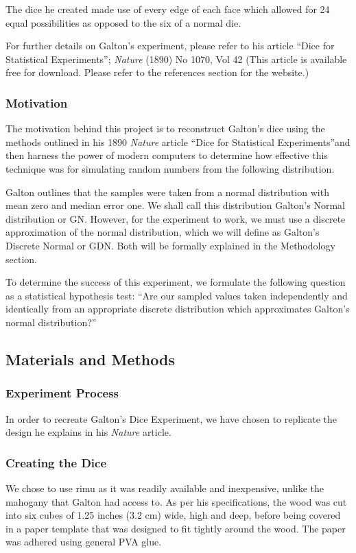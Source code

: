 The dice he created made use of every edge of each face which allowed for 24 equal possibilities as opposed to the six of a normal die.

For further details on Galton's experiment, please refer to his article \textquotedblleft Dice for Statistical Experiments\textquotedblright; \textit{Nature} (1890) No 1070, Vol 42 (This article is available free for download. Please refer to the references section for the website.)

\subsubsection*{Motivation}
The motivation behind this project is to reconstruct Galton's dice using the methods outlined in his 1890 \textit{Nature} article \textquotedblleft Dice for Statistical Experiments\textquotedblright and then harness the power of modern computers to determine how effective this technique was for simulating random numbers from the following distribution. 

Galton outlines that the samples were taken from a normal distribution with mean zero and median error one. We shall call this distribution Galton's Normal distribution or GN. However, for the experiment to work, we must use a discrete approximation of the normal distribution, which we will define as Galton's Discrete Normal or GDN. Both will be formally explained in the Methodology section. 

To determine the success of this experiment, we formulate the following question as a statistical hypothesis test:
\textquotedblleft Are our sampled values taken independently and identically from an appropriate discrete distribution which approximates Galton's normal distribution?\textquotedblright 


\subsection*{Materials and Methods}
\subsubsection*{Experiment Process}
In order to recreate Galton's Dice Experiment, we have chosen to replicate the design he explains in his \textit{Nature} article. 

\subsubsection*{Creating the Dice}
We chose to use rimu as it was readily available and inexpensive, unlike the mahogany that Galton had access to. As per his specifications, the wood was cut into six cubes of 1.25 inches (3.2 cm) wide, high and deep, before being covered in a paper template that was designed to fit tightly around the wood. The paper was adhered using general PVA glue. 

